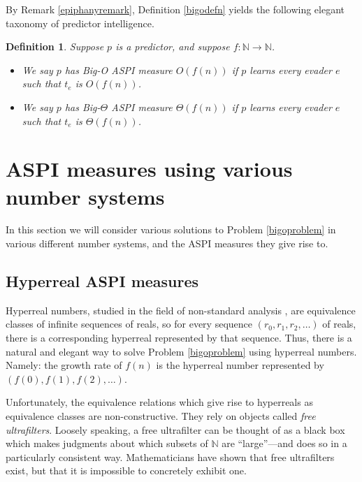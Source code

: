 \documentclass{article}
\newtheorem{definition}[theorem]{Definition}
\begin{document}
By Remark \ref{epiphanyremark}, Definition \ref{bigodefn} yields the following elegant
taxonomy of predictor intelligence.

\begin{definition}
\label{bigointelligencedefn}
    Suppose $p$ is a predictor, and suppose $f:\mathbb N\to\mathbb N$.
    \begin{itemize}
        \item
        We say \emph{$p$ has Big-O ASPI measure $O(f(n))$} if
        $p$ learns every evader $e$ such that $t_e$ is $O(f(n))$.
        \item
        We say \emph{$p$ has Big-$\Theta$ ASPI measure $\Theta(f(n))$} if
        $p$ learns every evader $e$ such that $t_e$ is $\Theta(f(n))$.
    \end{itemize}
\end{definition}

\section{ASPI measures using various number systems}
\label{exoticsection}

In this section we will consider various solutions to
Problem \ref{bigoproblem} in various different number systems,
and the ASPI measures they give rise to.

\subsection{Hyperreal ASPI measures}

Hyperreal numbers, studied in the field of non-standard analysis \cite{robinson}
\cite{goldblatt2012lectures},
are equivalence classes of infinite sequences of reals,
so for every sequence $(r_0,r_1,r_2,\ldots)$ of reals, there is a corresponding
hyperreal represented by that sequence.
Thus, there is a natural and elegant way to solve Problem \ref{bigoproblem}
using hyperreal numbers. Namely: the growth rate of $f(n)$ is the hyperreal number
represented by $(f(0),f(1),f(2),\ldots)$.

Unfortunately, the equivalence relations which give rise to hyperreals as
equivalence classes are non-constructive. They rely on objects called
\emph{free ultrafilters}.
Loosely speaking, a free ultrafilter can be thought
of as a black box which makes judgments about which subsets of $\mathbb N$
are ``large''---and does so in a particularly consistent way.
Mathematicians have shown that free ultrafilters
exist, but that it is impossible to concretely exhibit one.
\end{document}
